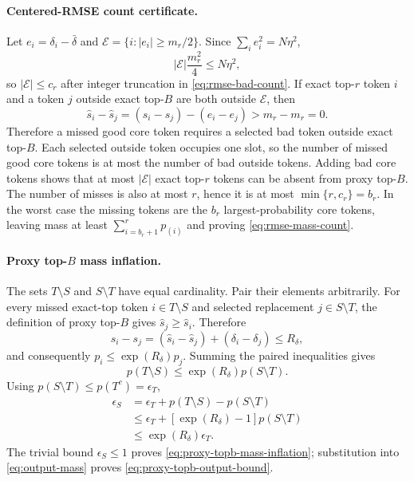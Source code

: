 \paragraph{Centered-RMSE count certificate.}
Let $e_i=\delta_i-\bar\delta$ and
$\mathcal E=\{i:|e_i|\ge m_r/2\}$.
Since $\sum_i e_i^2=N\eta^2$,
\begin{equation}
 |\mathcal E|\frac{m_r^2}{4}
 \le N\eta^2,
\end{equation}
so $|\mathcal E|\le c_r$ after integer truncation in
\cref{eq:rmse-bad-count}.  If exact top-$r$ token $i$ and a token $j$
outside exact top-$B$ are both outside $\mathcal E$, then
\begin{equation}
 \widehat s_i-\widehat s_j
 =(s_i-s_j)-(e_i-e_j)>m_r-m_r=0.
\end{equation}
Therefore a missed good core token requires a selected bad token outside
exact top-$B$.  Each selected outside token occupies one slot, so the number
of missed good core tokens is at most the number of bad outside tokens.
Adding bad core tokens shows that at most $|\mathcal E|$ exact top-$r$
tokens can be absent from proxy top-$B$.  The number of misses is also at
most $r$, hence it is at most $\min\{r,c_r\}=b_r$.  In the worst case the
missing tokens are the $b_r$ largest-probability core tokens, leaving mass
at least $\sum_{i=b_r+1}^{r}p_{(i)}$ and proving
\cref{eq:rmse-mass-count}.

\paragraph{Proxy top-$B$ mass inflation.}
The sets $T\setminus S$ and $S\setminus T$ have equal cardinality.  Pair
their elements arbitrarily.  For every missed exact-top token
$i\in T\setminus S$ and selected replacement $j\in S\setminus T$, the
definition of proxy top-$B$ gives $\widehat s_j\ge\widehat s_i$.  Therefore
\begin{equation}
 s_i-s_j
 =(\widehat s_i-\widehat s_j)+(\delta_i-\delta_j)
 \le R_\delta,
\end{equation}
and consequently $p_i\le\exp(R_\delta)p_j$.  Summing the paired inequalities
gives
\begin{equation}
 p(T\setminus S)\le
 \exp(R_\delta)p(S\setminus T).
\end{equation}
Using $p(S\setminus T)\le p(T^c)=\epsilon_T$,
\begin{align}
 \epsilon_S
 &=\epsilon_T+p(T\setminus S)-p(S\setminus T)\\
 &\le\epsilon_T+
 [\exp(R_\delta)-1]p(S\setminus T)\\
 &\le\exp(R_\delta)\epsilon_T.
\end{align}
The trivial bound $\epsilon_S\le1$ proves
\cref{eq:proxy-topb-mass-inflation}; substitution into
\cref{eq:output-mass} proves \cref{eq:proxy-topb-output-bound}.

